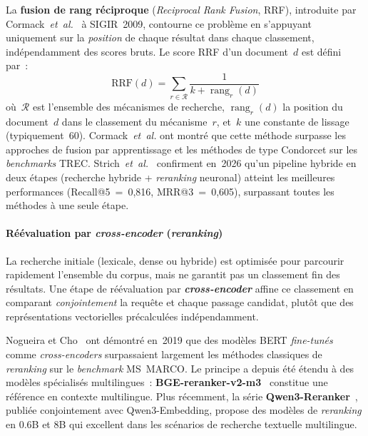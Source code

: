 \documentclass[11pt,a4paper]{article}
\begin{document}
La \textbf{fusion de rang réciproque} (\textit{Reciprocal Rank Fusion}, RRF), introduite par Cormack~\textit{et~al.}~\cite{cormack2009rrf} à SIGIR~2009, contourne ce problème en s'appuyant uniquement sur la \textit{position} de chaque résultat dans chaque classement, indépendamment des scores bruts. Le score RRF d'un document~$d$ est défini par~:
\begin{equation}
  \text{RRF}(d) = \sum_{r \in \mathcal{R}} \frac{1}{k + \operatorname{rang}_r(d)}
  \label{eq:rrf}
\end{equation}
où~$\mathcal{R}$ est l'ensemble des mécanismes de recherche, $\operatorname{rang}_r(d)$ la position du document~$d$ dans le classement du mécanisme~$r$, et~$k$ une constante de lissage (typiquement~60). Cormack~\textit{et~al.} ont montré que cette méthode surpasse les approches de fusion par apprentissage et les méthodes de type Condorcet sur les \textit{benchmarks} TREC. Strich~\textit{et~al.}~\cite{strich2026bm25} confirment en~2026 qu'un pipeline hybride en deux étapes (recherche hybride + \textit{reranking} neuronal) atteint les meilleures performances (Recall@5~=~0,816, MRR@3~=~0,605), surpassant toutes les méthodes à une seule étape.

\paragraph{Réévaluation par \textit{cross-encoder} (\textit{reranking})}

La recherche initiale (lexicale, dense ou hybride) est optimisée pour parcourir rapidement l'ensemble du corpus, mais ne garantit pas un classement fin des résultats. Une étape de réévaluation par \textbf{\textit{cross-encoder}} affine ce classement en comparant \textit{conjointement} la requête et chaque passage candidat, plutôt que des représentations vectorielles précalculées indépendamment.

Nogueira et Cho~\cite{nogueira2019bert} ont démontré en~2019 que des modèles BERT \textit{fine-tunés} comme \textit{cross-encoders} surpassaient largement les méthodes classiques de \textit{reranking} sur le \textit{benchmark} MS~MARCO. Le principe a depuis été étendu à des modèles spécialisés multilingues~: \textbf{BGE-reranker-v2-m3}~\cite{xiao2024bge} constitue une référence en contexte multilingue. Plus récemment, la série \textbf{Qwen3-Reranker}~\cite{zhang2025qwen3embedding}, publiée conjointement avec Qwen3-Embedding, propose des modèles de \textit{reranking} en 0.6B et 8B qui excellent dans les scénarios de recherche textuelle multilingue.
\end{document}
